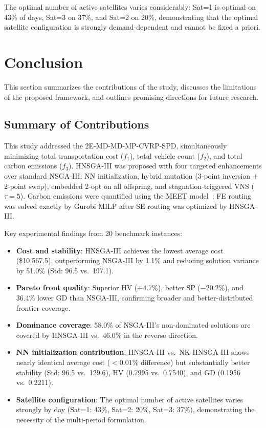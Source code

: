 \documentclass[11pt, a4paper]{article}
\numberwithin{equation}{section}
\begin{document}
The optimal number of active satellites varies considerably: Sat=1 is optimal
on 43\% of days, Sat=3 on 37\%, and Sat=2 on 20\%, demonstrating that the
optimal satellite configuration is strongly demand-dependent and cannot be
fixed a priori.

\section{Conclusion}
\label{sec:conc}

This section summarizes the contributions of the study, discusses the
limitations of the proposed framework, and outlines promising directions for
future research.

\subsection{Summary of Contributions}

This study addressed the 2E-MD-MD-MP-CVRP-SPD, simultaneously minimizing
total transportation cost ($f_1$), total vehicle count ($f_2$), and total
carbon emissions ($f_3$).  HNSGA-III was proposed with four targeted
enhancements over standard NSGA-III: NN initialization, hybrid mutation
(3-point inversion + 2-point swap), embedded 2-opt on all offspring, and
stagnation-triggered VNS ($\tau=5$).  Carbon emissions were quantified
using the MEET model~\cite{hickman1999}; FE routing was solved exactly by
Gurobi MILP after SE routing was optimized by HNSGA-III\@.

Key experimental findings from 20 benchmark instances:
\begin{itemize}
  \item \textbf{Cost and stability}: HNSGA-III achieves the lowest average
        cost (\$10{,}567.5), outperforming NSGA-III by 1.1\% and reducing
        solution variance by 51.0\% (Std: 96.5 vs.\ 197.1).
  \item \textbf{Pareto front quality}: Superior HV ($+4.7\%$), better SP
        ($-20.2\%$), and 36.4\% lower GD than NSGA-III, confirming broader
        and better-distributed frontier coverage.
  \item \textbf{Dominance coverage}: 58.0\% of NSGA-III's non-dominated
        solutions are covered by HNSGA-III vs.\ 46.0\% in the reverse
        direction.
  \item \textbf{NN initialization contribution}: HNSGA-III vs.\
        NK-HNSGA-III shows nearly identical average cost ($<0.01\%$
        difference) but substantially better stability (Std: 96.5 vs.\
        129.6), HV (0.7995 vs.\ 0.7540), and GD (0.1956 vs.\ 0.2211).
  \item \textbf{Satellite configuration}: The optimal number of active
        satellites varies strongly by day (Sat=1: 43\%, Sat=2: 20\%,
        Sat=3: 37\%), demonstrating the necessity of the multi-period
        formulation.
\end{itemize}
\end{document}
